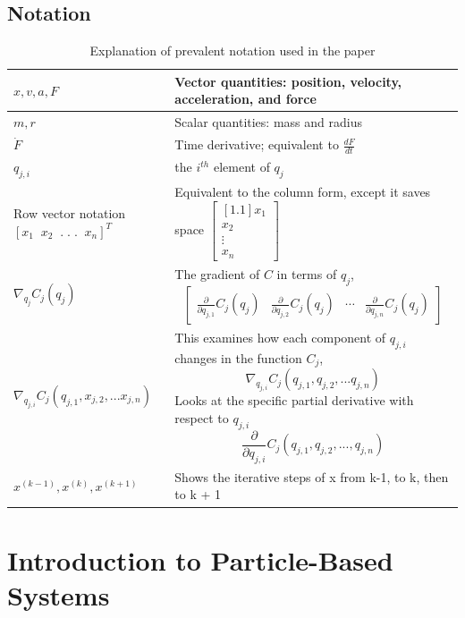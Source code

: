 \documentclass[12pt, letterpaper]{article}
\begin{document}
\subsection{Notation}
\def\arraystretch{2}%
\begin{table}[H]
\begin{tabular}{ | m{10em} | m{11.5cm}| }
  \hline
  $x, v, a, F$ & Vector quantities: position, velocity, acceleration, and force \\ 
  \hline
  $m, r$ & Scalar quantities: mass and radius \\ 
  \hline
  $\dot{F}$ & Time derivative; equivalent to $\frac{dF}{dt}$  \\ 
    \hline
  $q_{j,i}$ & the $i^{th}$ element of $q_j$  \\ 
  \hline
  Row vector notation $\left[ x_{1}\;\; x_{2}\;\; .\; . \; .\;\;  x_{n}  \right] ^{T}$ & Equivalent to the column form, except it saves space $\begin{bmatrix}[1.1]x_{1} \\x_{2} \\ \vdots \\ x_{n}  \end{bmatrix}$ \\ 
  \hline
  $\nabla_{q_j} C_j(q_j)$ & The gradient of $C$ in terms of $q_j$, $$\begin{bmatrix} \frac{\partial}{\partial q_{j,1}} C_j(q_j)& \frac{\partial}{\partial q_{j,2}} C_j(q_j) & \cdots &  \frac{\partial}{\partial q_{j,n}} C_j(q_j)\end{bmatrix}$$ \\
  \hline
  $\nabla_{q_{j,i}}C_j(q_{j,1},x_{j,2},...x_{j,n})$ & This examines how each component of $q_{j,i}$ changes in the function $C_j$, $$\nabla_{q_{j,i}}C_j(q_{j,1},q_{j,2},...q_{j,n})$$ Looks at the specific partial derivative with respect to $q_{j,i}$
$$\frac{\partial}{\partial q_{j,i}} C_j(q_{j,1},q_{j,2}, . . ., q_{j,n})$$ \\
\hline
$x^{(k-1)}, x^{(k)}, x^{(k + 1)} $ & Shows the iterative steps of x from k-1, to k, then to k + 1\\
\hline
\end{tabular}
\centering
\caption{Explanation of prevalent notation used in the paper}
\label{table:table}
\end{table}
\clearpage

\section{Introduction to Particle-Based Systems}
\end{document}

